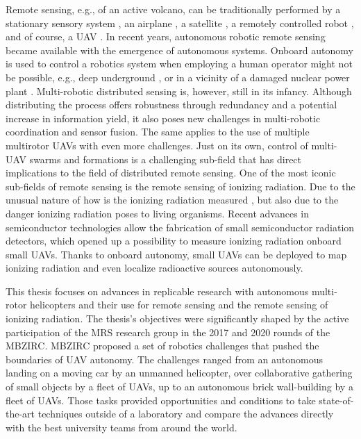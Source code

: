 \documentclass[a4paper,11pt,twoside,openright]{book}
\begin{document}
Remote sensing, e.g., of an active volcano, can be traditionally performed by a stationary sensory system \cite{ditraglia2018effusive}, an airplane \cite{walter2020eruption}, a satellite \cite{ganci2020variety}, a remotely controlled robot \cite{parcheta2016robotic}, and of course, a \ac{UAV} \cite{nagatani2018micro, ericksen2020locus}.
In recent years, autonomous robotic remote sensing became available with the emergence of autonomous systems.
Onboard autonomy is used to control a robotics system when employing a human operator might not be possible, e.g., deep underground \cite{apachristos2019autonomous, losch2018design}, or in a vicinity of a damaged nuclear power plant \cite{sato2019radiation}.
Multi-robotic distributed sensing is, however, still in its infancy.
Although distributing the process offers robustness through redundancy and a potential increase in information yield, it also poses new challenges in multi-robotic coordination and sensor fusion.
The same applies to the use of multiple multirotor \acp{UAV} with even more challenges.
Just on its own, control of multi-\ac{UAV} swarms and formations is a challenging sub-field that has direct implications to the field of distributed remote sensing.
One of the most iconic sub-fields of remote sensing is the remote sensing of ionizing radiation.
Due to the unusual nature of how is the ionizing radiation measured \cite{andreo2017fundamentals}, but also due to the danger ionizing radiation poses to living organisms.
Recent advances in semiconductor technologies allow the fabrication of small semiconductor radiation detectors, which opened up a possibility to measure ionizing radiation onboard small \acp{UAV}.
Thanks to onboard autonomy, small \acp{UAV} can be deployed to map ionizing radiation and even localize radioactive sources autonomously.

This thesis focuses on advances in replicable research with autonomous multi-rotor helicopters and their use for remote sensing and the remote sensing of ionizing radiation.
The thesis's objectives were significantly shaped by the active participation of the \ac{MRS} research group in the 2017 and 2020 rounds of the \ac{MBZIRC}.
MBZIRC proposed a set of robotics challenges that pushed the boundaries of \ac{UAV} autonomy.
The challenges ranged from an autonomous landing on a moving car by an unmanned helicopter, over collaborative gathering of small objects by a fleet of \acp{UAV}, up to an autonomous brick wall-building by a fleet of \acp{UAV}.
Those tasks provided opportunities and conditions to take state-of-the-art techniques outside of a laboratory and compare the advances directly with the best university teams from around the world.
\end{document}
